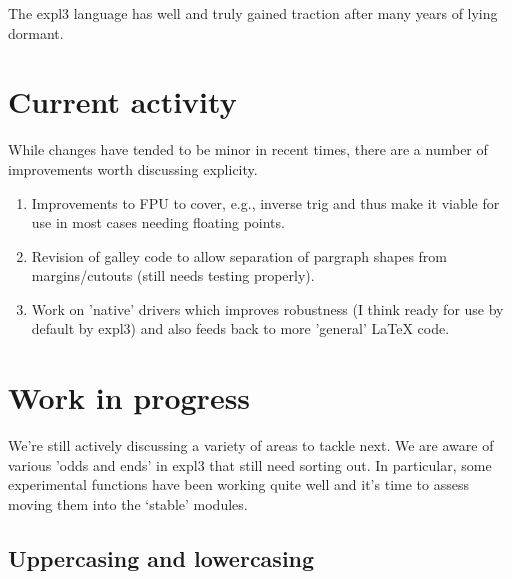 \documentclass{ltnews}
\begin{document}
The expl3 language has well and truly gained traction after many years of lying dormant.


\section{Current activity}

While changes have tended to be minor in recent times, there are a number of improvements worth discussing explicity.

\begin{enumerate}
\item
Improvements to FPU to cover, e.g., inverse trig and thus make it
  viable for use in most cases needing floating points.
\item
Revision of galley code to allow separation of pargraph shapes from
  margins/cutouts (still needs testing properly).
\item
Work on 'native' drivers which improves robustness (I think ready for
  use by default by expl3) and also feeds back to more 'general' LaTeX
  code.
\end{enumerate}



\section{Work in progress}

We're still actively discussing a variety of areas to tackle next.
We are aware of various 'odds and ends' in expl3 that still need sorting out.
In particular, some experimental functions have been working quite well and it's time to assess moving them into the `stable' modules.

\subsection{Uppercasing and lowercasing}
\end{document}
